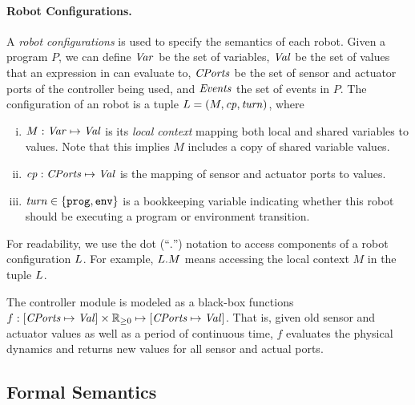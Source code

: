 \paragraph{Robot Configurations.}

A \emph{robot configurations} is used to specify the semantics of each robot.
Given a \lgname program $P$, we can define $\mathit{Var}$ be the set of variables,
$\mathit{Val}$ be the set of values that an expression in \lgname can evaluate to,
$\mathit{CPorts}$ be the set of sensor and actuator ports of the controller being used,
and $\mathit{Events}$ the set of events in $P$.
%
%
The configuration of an robot is a tuple $L = ({M},\mathit{cp},\mathit{turn})$, where

\begin{enumerate}[(i)]
\item ${M} : \mathit{Var} \mapsto \mathit{Val}$ is its \emph{local context} mapping both local and shared variables to values.
      Note that this implies $M$ includes a copy of shared variable values.
\item $\mathit{cp} : \mathit{CPorts} \mapsto \mathit{Val}$ is the mapping of sensor and actuator ports to values.
\item $\mathit{turn} \in \{\mathtt{prog},\mathtt{env}\}$ is a bookkeeping variable indicating whether this robot should be executing a program or environment transition.
\end{enumerate}
For readability, we use the dot (``$.$'') notation to access components of a robot configuration $L$.
For example, $L.M$ means accessing the local context $M$ in the tuple $L$.

The controller module is modeled as a black-box functions
$f: [\Cfield \mapsto \Val] \times \nnreals \mapsto [\Cfield \mapsto \Val]$.
That is, given old sensor and actuator values as well as a period of continuous time,
$f$ evaluates the physical dynamics and returns new values for all sensor and actual ports.


\subsection{Formal Semantics}\label{sec:semantics}

\newcommand{\StmtSeqRuleOne}{\textsc{StmtSeq1}\xspace}
\newcommand{\StmtSeqRuleTwo}{\textsc{StmtSeq2}\xspace}
\newcommand{\SelectEventRule}{\textsc{SelectEvent}\xspace}
\newcommand{\SkipEventRule}{\textsc{SkipEvent}\xspace}
\newcommand{\EndEventRule}{\textsc{EndEvent}\xspace}
\newcommand{\EventTransRule}{\textsc{EventTrans}\xspace}
\newcommand{\EndProgTransRule}{\textsc{EndProgTrans}\xspace}
\newcommand{\RobotEnvRule}{\textsc{RobotEnv}\xspace}
\newcommand{\EnvTransRule}{\textsc{EnvTrans}\xspace}
\newcommand{\exprule}{\rightarrow_E\xspace}
\newcommand{\stmtrule}{\rightarrow_\mathit{stmt}\xspace}
\newcommand{\sysrule}{\rightarrow_\mathit{Env}\xspace}
\newcommand{\progtrans}{\rightarrow_\mathit{prog}\xspace}
\newcommand{\envtrans}{\rightarrow_\mathit{env}\xspace}
\newcommand{\SelectEvent}{\ensuremath{\mathtt{\oplus}}\xspace}
\newcommand{\EndEvent}{\ensuremath{\mathtt{\boldsymbol{\cdot}}}\xspace}

